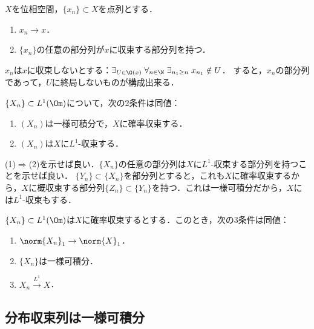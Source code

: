\documentclass[uplatex,dvipdfmx]{jsreport}
\begin{document}
\begin{lemma}
    $X$を位相空間，$\{x_n\}\subset X$を点列とする．
    \begin{enumerate}
        \item $x_n\to x$．
        \item $\{x_n\}$の任意の部分列が$x$に収束する部分列を持つ．
    \end{enumerate}
\end{lemma}
\begin{Proof}
    $x_n$は$x$に収束しないとする：$\exists_{U\in\O(x)}\;\forall_{n\in\N}\;\exists_{n_1\ge n}\;x_{n_1}\notin U$．
    すると，$x_n$の部分列であって，$U$に終局しないものが構成出来る．
\end{Proof}

\begin{theorem}\label{thm-characterization-of-probabilistic-convergence-in-terms-of-as-convergence}
    $\{X_n\}\subset L^1(\Om)$について，次の2条件は同値：
    \begin{enumerate}
        \item $(X_n)$は一様可積分で，$X$に確率収束する．
        \item $(X_n)$は$X$に$L^1$-収束する．
    \end{enumerate}
\end{theorem}
\begin{Proof}
    (1)$\Rightarrow$(2)を示せば良い．$\{X_n\}$の任意の部分列は$X$に$L^1$-収束する部分列を持つことを示せば良い．
    $\{Y_n\}\subset\{X_n\}$を部分列とすると，これも$X$に確率収束するから，$X$に概収束する部分列$\{Z_n\}\subset\{Y_n\}$を持つ．これは一様可積分だから，$X$には$L^1$-収束もする．
\end{Proof}

\begin{theorem}
    $\{X_n\}\subset L^1(\Om)$は$X$に確率収束するとする．このとき，次の3条件は同値：
    \begin{enumerate}
        \item $\norm{X_n}_1\to \norm{X}_1$．
        \item $\{X_n\}$は一様可積分．
        \item $X_n\xrightarrow{L^1} X$．
    \end{enumerate}
\end{theorem}

\subsection{分布収束列は一様可積分}
\end{document}
